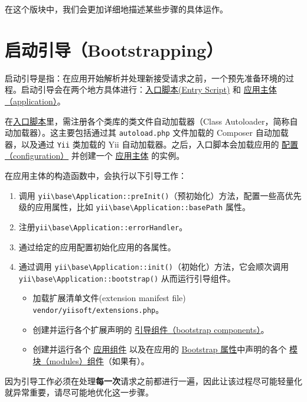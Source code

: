在这个版块中，我们会更加详细地描述某些步骤的具体运作。



\label{runtime-bootstrapping.md}\section{启动引导（Bootstrapping）}
启动引导是指：在应用开始解析并处理新接受请求之前，一个预先准备环境的过程。启动引导会在两个地方具体进行：\hyperref[structure-entry-scripts.md]{入口脚本(Entry Script)}
和 \hyperref[structure-applications.md]{应用主体（application）}。

在\hyperref[structure-entry-scripts.md]{入口脚本}里，需注册各个类库的类文件自动加载器（Class Autoloader，简称自动加载器）。这主要包括通过其 \lstinline|autoload.php| 文件加载的
Composer 自动加载器，以及通过 \lstinline|Yii| 类加载的 Yii 自动加载器。之后，入口脚本会加载应用的
\hyperref[concept-configurations.md]{配置（configuration）}
并创建一个 \hyperref[structure-applications.md]{应用主体} 的实例。

在应用主体的构造函数中，会执行以下引导工作：

\begin{enumerate}
\item 调用 \texttt{yii{\allowbreak{}\textbackslash}base{\allowbreak{}\textbackslash}Application\allowbreak{}::\allowbreak{}preInit()}（预初始化）方法，配置一些高优先级的应用属性，比如 \texttt{yii{\allowbreak{}\textbackslash}base{\allowbreak{}\textbackslash}Application\allowbreak{}::\allowbreak{}basePath} 属性。
\item 注册\texttt{yii{\allowbreak{}\textbackslash}base{\allowbreak{}\textbackslash}Application\allowbreak{}::\allowbreak{}errorHandler}。
\item 通过给定的应用配置初始化应用的各属性。
\item 通过调用 \texttt{yii{\allowbreak{}\textbackslash}base{\allowbreak{}\textbackslash}Application\allowbreak{}::\allowbreak{}init()}（初始化）方法，它会顺次调用
\texttt{yii{\allowbreak{}\textbackslash}base{\allowbreak{}\textbackslash}Application\allowbreak{}::\allowbreak{}bootstrap()} 从而运行引导组件。\begin{itemize}
\item 加载扩展清单文件(extension manifest file) \lstinline|vendor/yiisoft/extensions.php|。
\item 创建并运行各个扩展声明的 \hyperref[structure-extensions.md::bootstrapping-classes]{引导组件（bootstrap components）}。
\item 创建并运行各个 \hyperref[structure-application-components.md]{应用组件} 以及在应用的 \hyperref[structure-applications.md::bootstrap]{Bootstrap 属性}中声明的各个
\hyperref[structure-modules.md]{模块（modules）组件}（如果有）。
\end{itemize}

\end{enumerate}
因为引导工作必须在处理\textbf{每一次}请求之前都进行一遍，因此让该过程尽可能轻量化就异常重要，请尽可能地优化这一步骤。

